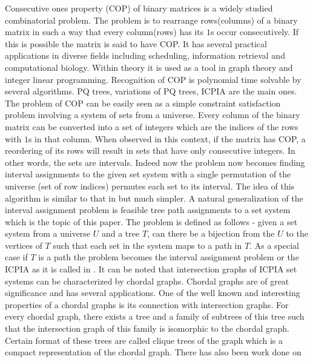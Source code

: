 \documentclass{llncs}
\begin{document}
\noindent
Consecutive ones property (COP) of binary matrices is a widely studied
combinatorial problem. The problem is to rearrange rows(columns) of a
binary matrix in such a way that every column(rows) has its $1$s occur
consecutively. If this is possible the matrix is said to have COP.  It
has several practical applications in diverse fields including
scheduling\cite{hl06}, information retrieval\cite{k77} and
computational biology\cite{abh98}. Within theory it is used as a tool
in graph theory\cite{mcg04} and integer linear
programming\cite{ht02,hl06}.  Recognition of COP is polynomial time
solvable by several algorithms. PQ trees\cite{bl76}, variations of PQ
trees\cite{mm09,wlh01,wlh02,mcc04}, ICPIA\cite{nsnrs09} are the main
ones.
\noindent
The problem of COP can be easily seen as a simple constraint
satisfaction problem involving a system of sets from a universe. Every
column of the binary matrix can be converted into a set of integers
which are the indices of the rows with $1$s in that column. When
observed in this context, if the matrix has COP, a reordering of its
rows will result in sets that have only consecutive integers. In other
words, the sets are intervals. Indeed now the problem now becomes
finding interval assignments to the given set system \cite{nsnrs09}
with a single permutation of the universe (set of row indices)
permutes each set to its interval. The idea of this algorithm is
similar to that in \cite{wlh02} but much simpler.
\noindent
A natural generalization of the interval assignment problem is
feasible tree path assignments to a set system which is the topic of
this paper. The problem is defined as follows - given a set system
from a universe $U$ and a tree $T$, can there be a bijection from the
$U$ to the vertices of $T$ such that each set in the system maps to a
path in $T$. As a special case if $T$ is a path the problem becomes
the interval assignment problem or the ICPIA as it is called in
\cite{nsnrs09}.
\noindent 
It can be noted that intersection graphs of ICPIA set systems can be
characterized by chordal graphs. Chordal graphs are of great
significance and has several applications. One of the well known and
interesting properties of a chordal graphs is its connection with
intersection graphs\cite{mcg04}. For every chordal graph, there exists
a tree and a family of subtrees of this tree such that the
intersection graph of this family is isomorphic to the chordal
graph\cite{plr70,gav78,bp93}. Certain format of these trees are called
clique trees\cite{apy92} of the graph which is a compact
representation of the chordal graph. There has also been work done on
\end{document}
